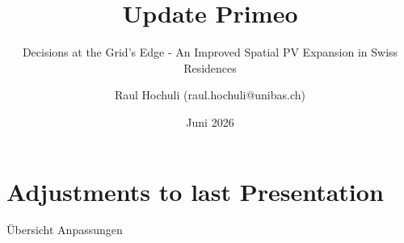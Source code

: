\documentclass[10pt, aspectratio=169]{beamer}
\title{Update Primeo}
\subtitle{Decisions at the Grid's Edge - An Improved Spatial PV Expansion in Swiss Residences}
\author{Raul Hochuli (raul.hochuli@unibas.ch)}
\institute{Universität Basel, Wirtschaftswissenschaftliche Fakultät}
\date{Juni 2026}
\begin{document}

\begin{frame}
  \maketitle
\end{frame}


\section{Adjustments to last Presentation}

\begin{frame}{Übersicht Anpassungen}
\begin{enumerate}


\end{enumerate}
\end{frame}
\end{document}
